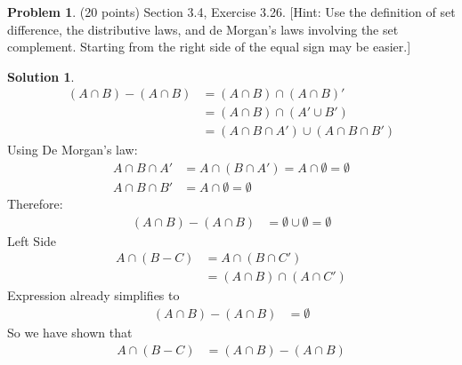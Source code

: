 \documentclass{article}
\theoremstyle{definition}
\newtheorem{problem}{Problem}
\newtheorem*{solution}{Solution}
\begin{document}
\newpage
\begin{problem} (20 points) Section 3.4, Exercise 3.26.
[Hint: Use the definition of set difference, the distributive laws, and de Morgan's
laws involving the set complement. Starting from the right side of the equal sign
may be easier.]
\end{problem}
\begin{solution} 
  \begin{align*}
    (A \cap B) - (A \cap B) &= (A \cap B) \cap (A \cap B)' \\
    &= (A \cap B) \cap (A' \cup B') \\
    &= (A \cap B \cap A') \cup (A \cap B \cap B')
  \end{align*}
  Using De Morgan's law:
  \begin{align*}
    A \cap B \cap A' &= A \cap (B \cap A') = A \cap \emptyset = \emptyset \\
    A \cap B \cap B' &= A \cap \emptyset = \emptyset
  \end{align*}
  Therefore:
  \begin{align*}
  (A \cap B) - (A \cap B) &= \emptyset \cup \emptyset = \emptyset
  \end{align*}
  Left Side
  \begin{align*}
    A \cap (B - C) &= A \cap (B \cap C') \\
    &= (A \cap B) \cap (A \cap C')
  \end{align*}
  Expression already simplifies to
  \begin{align*}
  ( A \cap B) - (A \cap B) &= \emptyset
  \end{align*}
  So we have shown that
  \begin{align*}
    A \cap (B - C) &= (A \cap B) - (A \cap B)
  \end{align*}
  \end{solution}
\end{document}
